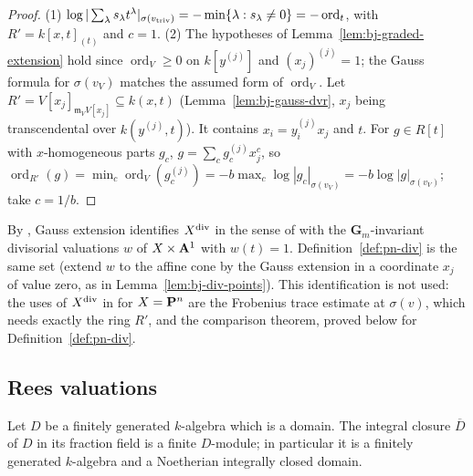 \begin{proof}
(1) $\log|\sum_\lambda s_\lambda t^\lambda|_{\sigma(v_{\mathrm{triv}})}=-\min\{\lambda:s_\lambda\ne0\}=-\operatorname{ord}_t$, with
$R'=k[x,t]_{(t)}$ and $c=1$. (2) The hypotheses of Lemma~\ref{lem:bj-graded-extension} hold since
$\operatorname{ord}_V\ge0$ on $k[y^{(j)}]$ and $(x_j)^{(j)}=1$; the Gauss formula for $\sigma(v_V)$ matches the assumed
form of $\operatorname{ord}_V$. Let $R'=V[x_j]_{\mathfrak m_VV[x_j]}\subseteq k(x,t)$ (Lemma~\ref{lem:bj-gauss-dvr},
$x_j$ being transcendental over $k(y^{(j)},t)$). It contains $x_i=y^{(j)}_ix_j$ and $t$. For $g\in R[t]$ with
$x$-homogeneous parts $g_c$, $g=\sum_cg_c^{(j)}x_j^c$, so
$\operatorname{ord}_{R'}(g)=\min_c\operatorname{ord}_V(g_c^{(j)})=-b\max_c\log|g_c|_{\sigma(v_V)}=-b\log|g|_{\sigma(v_V)}$; take $c=1/b$.
\end{proof}

\begin{remark}\label{rmk:bj-div-comparison-BJ}
By \cite[\S1.3]{BJ22}, Gauss extension identifies $X^{\mathrm{div}}$ in the sense of \cite[\S1.1]{BJ22} with the
$\mathbf G_m$-invariant divisorial valuations $w$ of $X\times\mathbf{A}^1$ with $w(t)=1$. Definition~\ref{def:pn-div}
is the same set (extend $w$ to the affine cone by the Gauss extension in a coordinate $x_j$ of value zero,
as in Lemma~\ref{lem:bj-div-points}). This identification is not used: the uses of $X^{\mathrm{div}}$ in
\cite[\S3]{FHX} for $X=\mathbf{P}^n$ are the Frobenius trace estimate at $\sigma(v)$, which needs exactly the
ring $R'$, and the comparison theorem, proved below for Definition~\ref{def:pn-div}.
\end{remark}

\subsection{Rees valuations}

\begin{theorem}\label{thm:bj-normalization-finite}
\leanok
Let $D$ be a finitely generated $k$-algebra which is a domain. The integral closure $\overline D$ of $D$
in its fraction field is a finite $D$-module; in particular it is a finitely generated $k$-algebra and a
Noetherian integrally closed domain.
\end{theorem}

